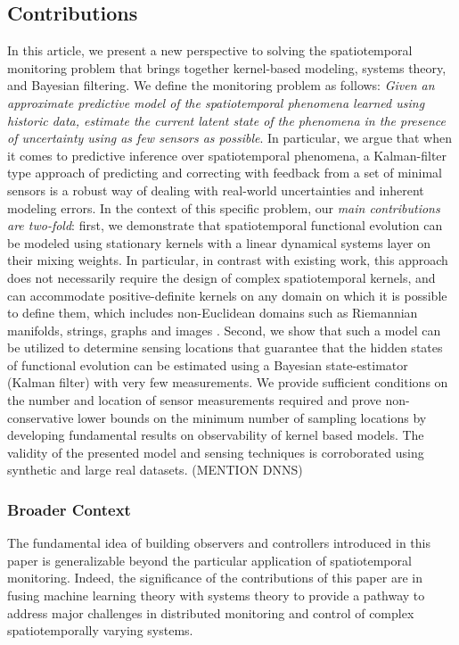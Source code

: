 \subsection{Contributions}
In this article, we present a new perspective to solving the spatiotemporal monitoring problem that brings together kernel-based modeling, systems theory, and Bayesian filtering. We define the monitoring problem as follows: \textit{Given an approximate predictive model of the spatiotemporal phenomena learned using historic data, estimate the current latent state of the phenomena in the presence of uncertainty using as few sensors as possible}. In particular, we argue that when it comes to predictive inference over spatiotemporal phenomena, a Kalman-filter type approach of predicting and correcting with feedback from a set of minimal sensors is a robust way of dealing with real-world uncertainties and inherent modeling errors.  In the context of this specific problem, our \textit{main contributions are two-fold}: first, we demonstrate that spatiotemporal functional evolution can be modeled using stationary kernels with a linear dynamical systems layer on their mixing weights. In particular, in contrast with existing work, this approach does not necessarily require the design of complex spatiotemporal kernels, and can accommodate positive-definite kernels on any domain on which it is possible to define them, which includes non-Euclidean domains such as Riemannian manifolds, strings, graphs and images \cite{Jayasumana_PAMI2015_RBFs}. Second, we show that such a model can be utilized to determine sensing locations that guarantee that the hidden states of functional evolution can be estimated using a Bayesian state-estimator (Kalman filter) with very few measurements. We provide sufficient conditions on the number and location of sensor measurements required and prove non-conservative lower bounds on the minimum number of sampling locations by developing fundamental results on observability of kernel based models. The validity of the presented model and sensing techniques is corroborated using synthetic and large real datasets. (MENTION DNNS)

\subsubsection*{Broader Context}
The fundamental idea of building observers and controllers introduced in this paper is generalizable beyond the particular application of spatiotemporal monitoring. Indeed, the significance of the contributions of this paper are in fusing machine learning theory with systems theory to provide a pathway to address major challenges in distributed monitoring and control of complex spatiotemporally varying systems. 



